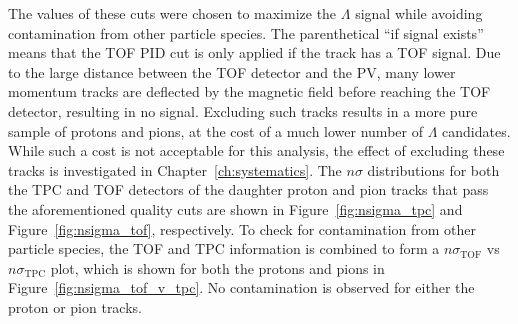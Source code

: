 The values of these cuts were chosen to maximize the $\Lambda$ signal while avoiding contamination from other particle species. The parenthetical ``if signal exists'' means that the TOF PID cut is only applied if the track has a TOF signal. Due to the large distance between the TOF detector and the PV, many lower momentum tracks are deflected by the magnetic field before reaching the TOF detector, resulting in no signal. Excluding such tracks results in a more pure sample of protons and pions, at the cost of a much lower number of $\Lambda$ candidates. While such a cost is not acceptable for this analysis, the effect of excluding these tracks is investigated in Chapter~\ref{ch:systematics}. The $n\sigma$ distributions for both the TPC and TOF detectors of the daughter proton and pion tracks that pass the aforementioned quality cuts are shown in Figure~\ref{fig:nsigma_tpc} and Figure~\ref{fig:nsigma_tof}, respectively. To check for contamination from other particle species, the TOF and TPC information is combined to form a $n\sigma_{\text{TOF}}$ vs $n\sigma_{\text{TPC}}$ plot, which is shown for both the protons and pions in Figure~\ref{fig:nsigma_tof_v_tpc}. No contamination is observed for either the proton or pion tracks.

